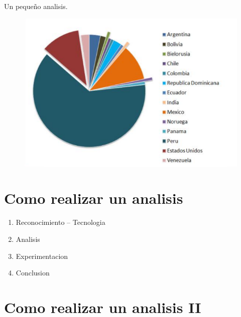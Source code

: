 \documentclass[12pt]{beamer} %
\begin{document}
\begin{slide}
 Un pequeño analisis.
    \begin{figure}[h]
      \begin{center}
        \includegraphics[height=0.8\textheight]{img/estadistica.png}
       \end{center}
    \end{figure}
  
\end{slide}


%



\section{Como realizar un analisis}	

\begin{slide}
  \begin{enumerate}
  \item Reconocimiento -- Tecnologia\pause
  \item Analisis\pause
  \item Experimentacion\pause
  \item Conclusion
  \end{enumerate}
\end{slide}

\section{Como realizar un analisis II}	
\end{document}
